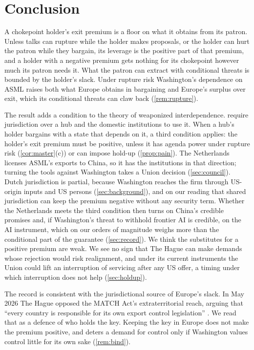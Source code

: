 \section{Conclusion}\label{sec:conclusion}

A chokepoint holder's exit premium is a floor on what it obtains from its patron. Unless talks can rupture while the holder makes proposals, or the holder can hurt the patron while they bargain, its leverage is the positive part of that premium, and a holder with a negative premium gets nothing for its chokepoint however much its patron needs it. What the patron can extract with conditional threats is bounded by the holder's slack. Under rupture risk Washington's dependence on ASML raises both what Europe obtains in bargaining and Europe's surplus over exit, which its conditional threats can claw back (\cref{rem:rupture}).

The result adds a condition to the theory of weaponized interdependence. \citet{farrell2019weaponized} require jurisdiction over a hub and the domestic institutions to use it. When a hub's holder bargains with a state that depends on it, a third condition applies: the holder's exit premium must be positive, unless it has agenda power under rupture risk (\cref{cor:master}(c)) or can impose hold-up (\cref{prop:pain}). The Netherlands licenses ASML's exports to China, so it has the institutions in that direction; turning the tools against Washington takes a Union decision (\cref{sec:council}). Dutch jurisdiction is partial, because Washington reaches the firm through US-origin inputs and US persons (\cref{sec:background}), and on our reading that shared jurisdiction can keep the premium negative without any security term. Whether the Netherlands meets the third condition then turns on China's credible promises and, if Washington's threat to withhold frontier AI is credible, on the AI instrument, which on our orders of magnitude weighs more than the conditional part of the guarantee (\cref{sec:record}). We think the substitutes for a positive premium are weak. We see no sign that The Hague can make demands whose rejection would risk realignment, and under its current instruments the Union could lift an interruption of servicing after any US offer, a timing under which interruption does not help (\cref{sec:holdup}).

The record is consistent with the jurisdictional source of Europe's slack. In May 2026 The Hague opposed the MATCH Act's extraterritorial reach, arguing that ``every country is responsible for its own export control legislation'' \citep[our translation]{tk2026match}. We read that as a defence of who holds the key. Keeping the key in Europe does not make the premium positive, and deters a demand for control only if Washington values control little for its own sake (\cref{rem:bind}).
